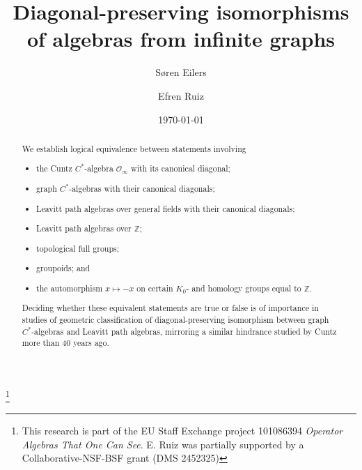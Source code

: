 \documentclass[11pt, letterpaper,final]{amsart}
\theoremstyle{definition}
\theoremstyle{remark}
\begin{document}
	
    \title[Diagonal-preserving isomorphisms]{Diagonal-preserving isomorphisms of algebras from infinite graphs}
    

 \author{S{\o}ren Eilers}
        \address{Department of Mathematical Sciences \\
        University of Copenhagen\\
        Universitetsparken~5 \\
        DK-2100 Copenhagen, Denmark}

        
	\author{Efren Ruiz}
        \address{Department of Mathematics\\University of Hawaii,
Hilo\\200 W. Kawili St.\\
Hilo, Hawaii\\
96720-4091 USA}
        
       
        \date{\today}
\thanks{This research is part of the EU Staﬀ Exchange project 101086394 \emph{Operator Algebras That One
Can See}. E. Ruiz was partially supported by a Collaborative-NSF-BSF grant (DMS 2452325)}

\begin{abstract}
We establish logical equivalence between statements involving
\begin{itemize}
\item the Cuntz $C^*$-algebra $\mathcal O_\infty$ with its canonical diagonal;
\item graph $C^*$-algebras  with their canonical diagonals;
\item Leavitt path algebras over general fields with their canonical diagonals;
\item Leavitt path algebras over $\mathbb Z$;
\item  topological full groups;
\item  groupoids; and
\item the automorphism  $x\mapsto -x$ on certain $K_0$- and homology groups equal to $\mathbb Z$.
\end{itemize}
Deciding whether these equivalent statements are true or false is of importance in   studies of geometric classification of diagonal-preserving isomorphism between graph $C^*$-algebras and Leavitt path algebras, mirroring a similar hindrance studied by Cuntz more than 40 years ago.
\end{abstract}
\end{document}
